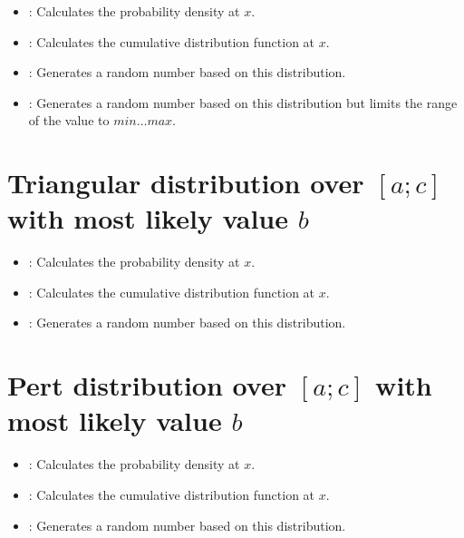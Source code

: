 \begin{itemize}

\item
{}:
Calculates the probability density at $x$.

\item
{}:
Calculates the cumulative distribution function at $x$.

\item
{}:
Generates a random number based on this distribution.

\item
{}:
Generates a random number based on this distribution but limits the range of the value to $min\ldots max$.

\end{itemize}



\section{Triangular distribution over \texorpdfstring{$[a;c]$}{[a;c]} with most likely value \texorpdfstring{$b$}{b}}

\begin{itemize}

\item
{}:
Calculates the probability density at $x$.

\item
{}:
Calculates the cumulative distribution function at $x$.

\item
{}:
Generates a random number based on this distribution.

\end{itemize}



\section{Pert distribution over \texorpdfstring{$[a;c]$}{[a;c]} with most likely value \texorpdfstring{$b$}{b}}

\begin{itemize}

\item
{}:
Calculates the probability density at $x$.

\item
{}:
Calculates the cumulative distribution function at $x$.

\item
{}:
Generates a random number based on this distribution.

\end{itemize}



